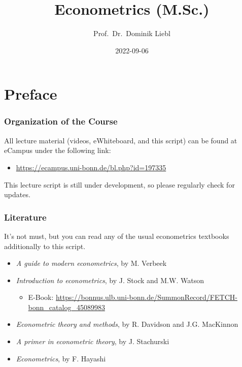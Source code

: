 \documentclass[
  14pt,
]{memoir}
\title{Econometrics (M.Sc.)}
\author{Prof.~Dr.~Dominik Liebl}
\date{2022-09-06}
\providecommand{\tightlist}{%
  \setlength{\itemsep}{0pt}\setlength{\parskip}{0pt}}
\begin{document}
\maketitle

{
\hypersetup{linkcolor=}
\setcounter{tocdepth}{1}
\tableofcontents
}
\hypertarget{preface}{%
\chapter*{Preface}\label{preface}}

\hypertarget{organization-of-the-course}{%
\subsection*{Organization of the Course}\label{organization-of-the-course}}

All lecture material (videos, eWhiteboard, and this script) can be found at eCampus under the following link:

\begin{itemize}
\tightlist
\item
  \url{https://ecampus.uni-bonn.de/bl.php?id=197335}
\end{itemize}

This lecture script is still under development, so please regularly check for updates.

\hypertarget{literature}{%
\subsection*{Literature}\label{literature}}

It's not must, but you can read any of the usual econometrics textbooks additionally to this script.

\begin{itemize}
\tightlist
\item
  \emph{A guide to modern econometrics}, by M. Verbeek
\item
  \emph{Introduction to econometrics}, by J. Stock and M.W. Watson

  \begin{itemize}
  \tightlist
  \item
    E-Book: \url{https://bonnus.ulb.uni-bonn.de/SummonRecord/FETCH-bonn_catalog_45089983}
  \end{itemize}
\item
  \emph{Econometric theory and methods}, by R. Davidson and J.G. MacKinnon
\item
  \emph{A primer in econometric theory}, by J. Stachurski
\item
  \emph{Econometrics}, by F. Hayashi
\end{itemize}
\end{document}
